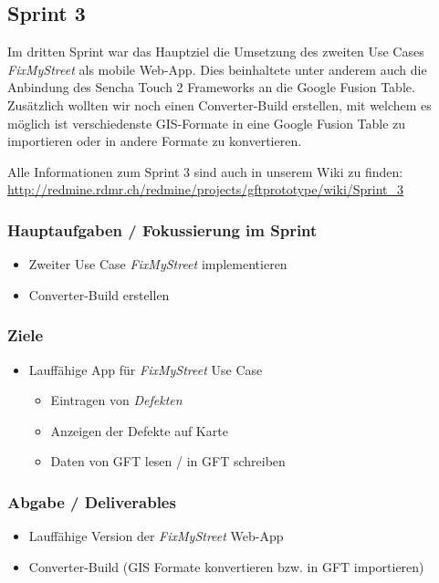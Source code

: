 \subsection{Sprint 3}

Im dritten Sprint war das Hauptziel die Umsetzung des zweiten Use Cases \emph{FixMyStreet} als mobile Web-App. Dies beinhaltete unter anderem auch die Anbindung des Sencha Touch 2 Frameworks an die Google Fusion Table.
Zusätzlich wollten wir noch einen Converter-Build erstellen, mit welchem es möglich ist verschiedenste \gls{GIS}-Formate in eine Google Fusion Table zu importieren oder in andere Formate zu konvertieren.

Alle Informationen zum Sprint 3 sind auch in unserem Wiki zu finden:
\url{http://redmine.rdmr.ch/redmine/projects/gftprototype/wiki/Sprint_3}

\subsubsection{Hauptaufgaben / Fokussierung im Sprint}
\begin{itemize}
	\item Zweiter Use Case \emph{FixMyStreet} implementieren
	\item Converter-Build erstellen
\end{itemize}

\subsubsection{Ziele}
\begin{itemize}
	\item Lauffähige App für \emph{FixMyStreet} Use Case
	\begin{itemize}
		\item Eintragen von \emph{Defekten}
		\item Anzeigen der Defekte auf Karte
		\item Daten von GFT lesen / in GFT schreiben
	\end{itemize}
\end{itemize}

\subsubsection{Abgabe / Deliverables}
\begin{itemize}
	\item Lauffähige Version der \emph{FixMyStreet} Web-App
	\item Converter-Build (\gls{GIS} Formate konvertieren bzw. in GFT importieren)
\end{itemize}

